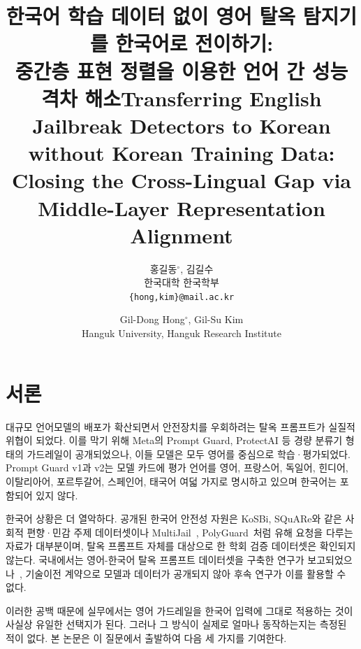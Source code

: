 \documentclass[twocolumn, 10pt]{article}
\title[korean]{한국어 학습 데이터 없이 영어 탈옥 탐지기를 한국어로 전이하기: \\ 중간층 표현 정렬을 이용한 언어 간 성능 격차 해소}
\title[english]{Transferring English Jailbreak Detectors to Korean without Korean Training Data: \\ Closing the Cross-Lingual Gap via Middle-Layer Representation Alignment}
\author[korean]{
홍길동$^{\circ}$, 김길수 \\
한국대학 한국학부\\
\texttt{\{hong,kim\}@mail.ac.kr}\\
}
\author[english]{
Gil-Dong Hong$^{\circ}$, Gil-Su Kim \\
Hanguk University, Hanguk Research Institute
}
\begin{document}

\section{서론}

대규모 언어모델의 배포가 확산되면서 안전장치를 우회하려는 탈옥 프롬프트가 실질적 위협이 되었다.
이를 막기 위해 Meta의 Prompt Guard, ProtectAI 등 경량 분류기 형태의 가드레일이 공개되었으나, 이들 모델은 모두 영어를 중심으로 학습·평가되었다.
Prompt Guard v1과 v2는 모델 카드에 평가 언어를 영어, 프랑스어, 독일어, 힌디어, 이탈리아어, 포르투갈어, 스페인어, 태국어 여덟 가지로 명시하고 있으며 한국어는 포함되어 있지 않다.

한국어 상황은 더 열악하다.
공개된 한국어 안전성 자원은 KoSBi, SQuARe와 같은 사회적 편향·민감 주제 데이터셋이나 MultiJail~\cite{deng:iclr2024}, PolyGuard~\cite{kumar:colm2025}처럼 유해 요청을 다루는 자료가 대부분이며, 탈옥 프롬프트 자체를 대상으로 한 학회 검증 데이터셋은 확인되지 않는다.
국내에서는 영어-한국어 탈옥 프롬프트 데이터셋을 구축한 연구가 보고되었으나~\cite{park:kiisc2025}, 기술이전 계약으로 모델과 데이터가 공개되지 않아 후속 연구가 이를 활용할 수 없다.

이러한 공백 때문에 실무에서는 영어 가드레일을 한국어 입력에 그대로 적용하는 것이 사실상 유일한 선택지가 된다.
그러나 그 방식이 실제로 얼마나 동작하는지는 측정된 적이 없다.
본 논문은 이 질문에서 출발하여 다음 세 가지를 기여한다.
\end{document}
